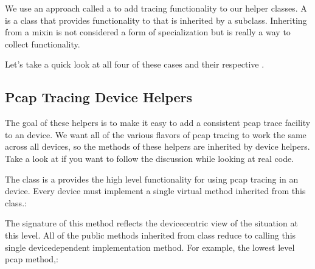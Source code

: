 \documentclass[letterpaper,10pt,english]{sphinxmanual}
\renewcommand{\sphinxcode}[1]{\texttt{\small{#1}}}
\begin{document}
We use an approach called a \sphinxcode{} to add tracing functionality to our helper
classes. A \sphinxcode{} is a class that provides functionality to that is
inherited by a subclass. Inheriting from a mixin is not considered a form of
specialization but is really a way to collect functionality.

Let’s take a quick look at all four of these cases and their respective
\sphinxcode{}.


\subsection{Pcap Tracing Device Helpers}
\label{\detokenize{tracing:pcap-tracing-device-helpers}}
The goal of these helpers is to make it easy to add a consistent pcap trace
facility to an  device. We want all of the various flavors of pcap tracing
to work the same across all devices, so the methods of these helpers are
inherited by device helpers. Take a look at \sphinxcode{\sphinxupquote{src/network/helper/trace\sphinxhyphen{}helper.h}} if you
want to follow the discussion while looking at real code.

The class \sphinxcode{} is a \sphinxcode{} provides the high level
functionality for using pcap tracing in an  device. Every device must
implement a single virtual method inherited from this class.:

\begin{sphinxVerbatim}[commandchars=\\\{\}]
          
\end{sphinxVerbatim}

The signature of this method reflects the device\sphinxhyphen{}centric view of the situation
at this level. All of the public methods inherited from class
\sphinxcode{} reduce to calling this single device\sphinxhyphen{}dependent
implementation method. For example, the lowest level pcap method,:

\begin{sphinxVerbatim}[commandchars=\\\{\}]
             
\end{sphinxVerbatim}
\end{document}
